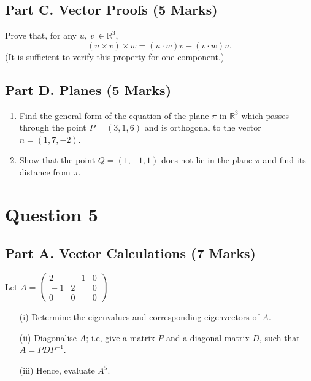\documentclass[a4paper,12pt]{article}
\begin{document}
	\subsection*{Part C. Vector Proofs (5 Marks) }		
 Prove that, for any $u,\:v\:\in\mathbb{R}^3$, %
			$$(u\times v)\times w= (u\cdot w)v - (v\cdot w)u.$$
			(It is sufficient to verify this property for one component.)

	\subsection*{Part D. Planes (5
	Marks)}
			\begin{enumerate}
				\item Find the general form of the equation of the plane $\pi$ in $\mathbb{R}^3$ which passes through the point 
				$P=(3,1,6)$ and is orthogonal to the vector $n=(1,7,-2)$. %
				
				\item Show that the point $Q=(1,-1,1)$ does not lie in the plane $\pi$ and find its distance from $\pi$. %
			\end{enumerate}

\newpage
\section*{Question 5}
	\subsection*{Part A. Vector Calculations (7 Marks)}
 Let $A=\displaystyle\left(\begin{array}{ccc} 
	2&\!\!\!-1&0\\
	\!\!\!-1& 2&0\\
	0& 0& 0\end{array}\right)$
	
	\begin{itemize}
		\item[(i)] Determine the eigenvalues and corresponding eigenvectors of $A$.
		
		\medskip\item[(ii)]  Diagonalise $A$; i.e, give a matrix $P$ and a diagonal matrix $D$, such that $A=PDP^{-1}$.
		
		\medskip \item[(iii)]  Hence, evaluate $A^5$.
	\end{itemize} \vspace{0.4cm}
	
\end{document}
